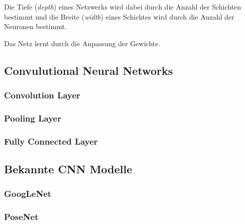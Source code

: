 Die Tiefe (\textit{depth}) eines Netzwerks wird dabei durch die Anzahl der Schichten bestimmt und die Breite (\textit{width}) eines Schichtes wird durch die Anzahl der Neuronen  bestimmt\cite{Goodfellow-et-al-2016}.

Das Netz lernt durch die Anpassung der Gewichte.
\subsection{Convulutional Neural Networks}
\subsubsection{Convolution Layer}
\subsubsection{Pooling Layer}
\subsubsection{Fully Connected Layer}
\subsection{Bekannte CNN Modelle}
\subsubsection{GoogLeNet}
\subsubsection{PoseNet}

\pagebreak